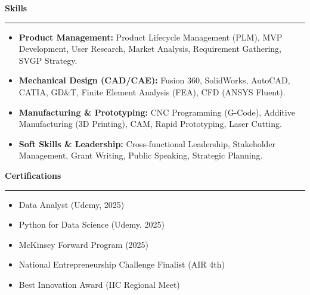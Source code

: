 \documentclass[9pt,letterpaper]{article} %
\newenvironment{rSection}[1]{ %
  \sectionskip
 \textbf{\Large #1} %
  \sectionlineskip
  \hrule %
  \begin{list}{}{ %
    \setlength{\leftmargin}{-0em} %
  }
  \item[]
}{
  \end{list}
}
\def\sectionlineskip{\smallskip} %
\def\sectionskip{} %
\begin{document}
\begin{rSection}{Skills}
\item[] \vspace{-0.5em}
\begin{itemize}[left=-1.5em, labelsep=.1cm, labelwidth=.2cm, itemsep=0.0em]

    \item \textbf{ Product Management:} Product Lifecycle Management (PLM), MVP Development, User Research, Market Analysis, Requirement Gathering, SVGP Strategy.

    \item \textbf{ Mechanical Design (CAD/CAE):} Fusion 360, SolidWorks, AutoCAD, CATIA, GD\&T, Finite Element Analysis (FEA), CFD (ANSYS Fluent).

    \item \textbf{ Manufacturing \& Prototyping:} CNC Programming (G-Code), Additive Manufacturing (3D Printing), CAM, Rapid Prototyping, Laser Cutting.

    \item \textbf{ Soft Skills \& Leadership:} Cross-functional Leadership, Stakeholder Management, Grant Writing, Public Speaking, Strategic Planning.

\end{itemize}
\end{rSection}

\begin{rSection}{Certifications}
\item[] \vspace{-1em}
\begin{itemize}[left=-1.5em, labelsep=.1cm, labelwidth=.2cm, itemsep=0.0em]

\item Data Analyst (Udemy, 2025)

\item Python for Data Science (Udemy, 2025)

\item McKinsey Forward Program (2025)

\item National Entrepreneurship Challenge Finalist (AIR 4th)

\item Best Innovation Award (IIC Regional Meet)

\end{itemize}
\end{rSection}
\end{document}
